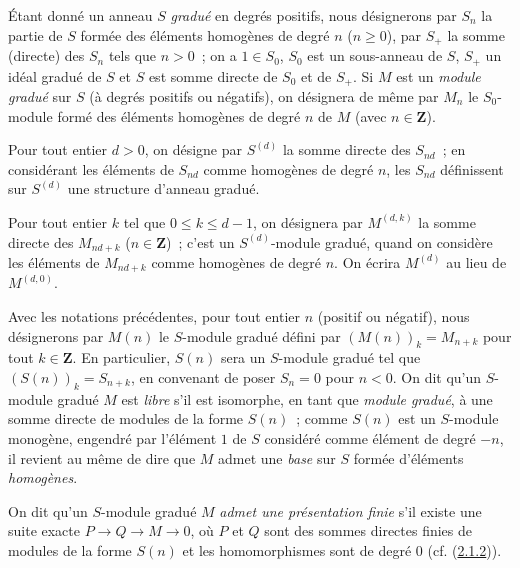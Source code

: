 \begin{notation}[2.1.1]
\label{II.2.1.1-fr}
Étant donné un anneau $S$ \emph{gradué} en degrés positifs, nous désignerons
par $S_n$ la partie de $S$ formée des éléments homogènes de degré $n$
($n\geq0$), par $S_+$ la somme (directe) des $S_n$ tels que $n>0$~; on a
$1\in S_0$, $S_0$ est un sous-anneau de $S$, $S_+$ un idéal gradué de $S$ et
$S$ est somme directe de $S_0$ et de $S_+$. Si $M$ est un \emph{module
gradué} sur $S$ (à degrés positifs ou négatifs), on désignera de même par
$M_n$ le $S_0$-module formé des éléments homogènes de degré $n$ de $M$ (avec
$n\in\mathbf{Z}$).

Pour tout entier $d>0$, on désigne par $S^{(d)}$ la somme directe des
$S_{nd}$~; en considérant les éléments de $S_{nd}$ comme homogènes de degré
$n$, les $S_{nd}$ définissent sur $S^{(d)}$ une structure d'anneau gradué.

Pour tout entier $k$ tel que $0\leq k\leq d-1$, on désignera par
$M^{(d,k)}$ la somme directe
des $M_{nd+k}$ ($n\in\mathbf{Z}$)~; c'est un $S^{(d)}$-module gradué, quand
on considère les éléments de $M_{nd+k}$ comme homogènes de degré $n$. On
écrira $M^{(d)}$ au lieu de $M^{(d,0)}$.

Avec les notations précédentes, pour tout entier $n$ (positif ou négatif),
nous désignerons par $M(n)$ le $S$-module gradué défini par
$(M(n))_k=M_{n+k}$ pour tout $k\in\mathbf{Z}$. En particulier, $S(n)$ sera
un $S$-module gradué tel que $(S(n))_k=S_{n+k}$, en convenant de poser
$S_n=0$ pour $n<0$. On dit qu'un $S$-module gradué $M$ est \emph{libre}
s'il est isomorphe, en tant que \emph{module gradué}, à une somme directe de
modules de la forme $S(n)$~; comme $S(n)$ est un $S$-module monogène,
engendré par l'élément $1$ de $S$ considéré comme élément de degré $-n$, il
revient au même de dire que $M$ admet une \emph{base} sur $S$ formée
d'éléments \emph{homogènes}.

On dit qu'un $S$-module gradué $M$ \emph{admet une présentation finie} s'il
existe une suite exacte $P\to Q\to M\to0$, où $P$ et $Q$ sont des sommes
directes finies de modules de la forme $S(n)$ et les homomorphismes sont de
degré $0$ (cf. (\hyperref[II.2.1.2-fr]{2.1.2})).
\end{notation}

